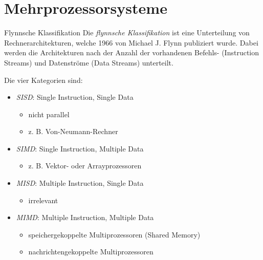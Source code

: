 \section{Mehrprozessorsysteme}

\begin{defi}{Flynnsche Klassifikation}
    Die \emph{flynnsche Klassifikation}  ist eine Unterteilung von Rechnerarchitekturen, welche 1966 von Michael J. Flynn publiziert wurde.
    Dabei werden die Architekturen nach der Anzahl der vorhandenen Befehls- (Instruction Streams) und Datenströme (Data Streams) unterteilt.

    Die vier Kategorien sind:
    \begin{itemize}
        \item \emph{SISD}: Single Instruction, Single Data
        \begin{itemize}
            \item nicht parallel
            \item z. B. Von-Neumann-Rechner
        \end{itemize}
        \item \emph{SIMD}: Single Instruction, Multiple Data
        \begin{itemize}
            \item z. B. Vektor- oder Arrayprozessoren
        \end{itemize}
        \item \emph{MISD}: Multiple Instruction, Single Data
        \begin{itemize}
            \item irrelevant
        \end{itemize}
        \item \emph{MIMD}: Multiple Instruction, Multiple Data
        \begin{itemize}
            \item speichergekoppelte Multiprozessoren (Shared Memory)
            \item nachrichtengekoppelte Multiprozessoren
        \end{itemize}
    \end{itemize}

    \centering
    \begin{tabular}{cc}
    \end{tabular}
\end{defi}

